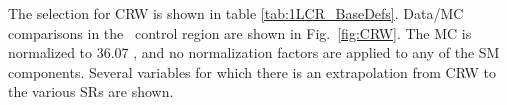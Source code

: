The selection for CRW is shown in table \ref{tab:1LCR_BaseDefs}.  Data/MC comparisons in the \Wjets\ control region are shown in
Fig.~\ref{fig:CRW}.  The MC is normalized to 36.07 \ifb,
and no normalization factors are applied to any of the SM
components. Several variables for which there is an extrapolation from
CRW to the various SRs are shown. \\ %

